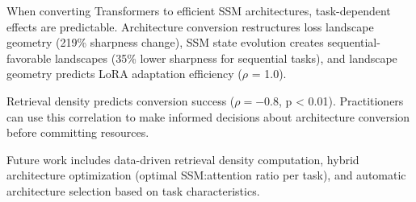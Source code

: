 
When converting Transformers to efficient SSM architectures, task-dependent effects are predictable. Architecture conversion restructures loss landscape geometry (219\% sharpness change), SSM state evolution creates sequential-favorable landscapes (35\% lower sharpness for sequential tasks), and landscape geometry predicts LoRA adaptation efficiency ($\rho$ = 1.0).

Retrieval density predicts conversion success ($\rho = -0.8$, p < 0.01). Practitioners can use this correlation to make informed decisions about architecture conversion before committing resources.

Future work includes data-driven retrieval density computation, hybrid architecture optimization (optimal SSM:attention ratio per task), and automatic architecture selection based on task characteristics.
